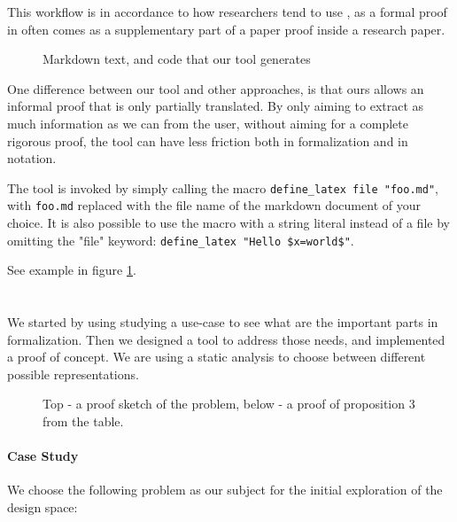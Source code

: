 \documentclass{article}
\makeatletter
\newcommand{\code}{\texttt}
\let\oldsection\section
\renewcommand{\section}{\@ifstar\customsectionstar\customsectionnostar}
\newcommand{\customsectionstar}[1]{\oldsection*{\large#1}\vspace{-0.5em}}
\newcommand{\customsectionnostar}[1]{\oldsection*{\large#1}\vspace{-0.5em}}
\makeatother
\begin{document}
This workflow is in accordance to how researchers tend to use \lean, as a formal
proof in \lean often comes as a supplementary part of a paper proof inside a
research paper.

\begin{figure}
    
    \caption{Markdown text, and \lean code that our tool generates}
    \label{fig:example}
\end{figure}

One difference between our tool and other approaches, is that ours allows an
informal proof that is only partially translated. By only aiming to extract as
much information as we can from the user, without aiming for a complete
rigorous proof, the tool can have less friction both in formalization and in
notation.

The tool is invoked by simply calling the macro \code{define\_latex file "foo.md"},
with \code{foo.md} replaced with the file name of the markdown document of your
choice. It is also possible to use the macro with a string literal instead of a
file by omitting the "file" keyword: \code{define\_latex "Hello \$x=world\$"}.

See example in figure \ref{fig:example}.

\section{Preliminary Work}
We started by using studying a use-case to see what are the important parts in
formalization. Then we designed a tool to address those needs, and implemented a
proof of concept. We are using a static analysis to choose between different
possible representations.

\begin{figure}
    \makebox[\textwidth][c]{ \scalebox{0.9}{} }
    \vspace{1em}
    
    \caption{Top - a proof sketch of the problem, below - a proof of proposition
    3 from the table.}
    \label{fig:conjectures}
\end{figure}

\paragraph{Case Study}
We choose the following problem as our subject for the initial exploration of
the design space:
\end{document}
